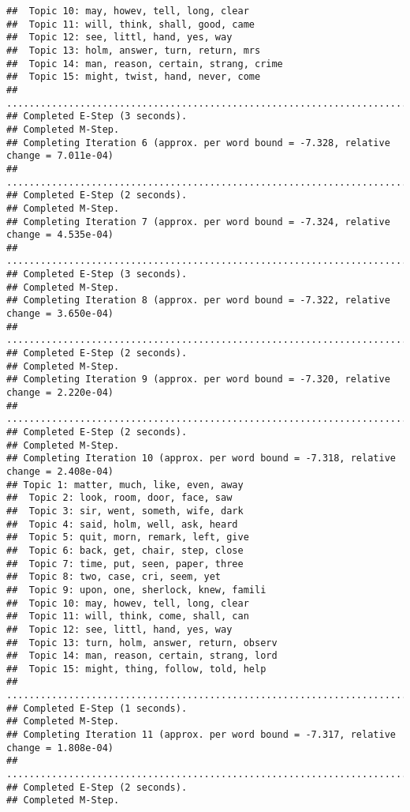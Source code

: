 \documentclass[
]{book}
\begin{document}
\begin{verbatim}
##  Topic 10: may, howev, tell, long, clear 
##  Topic 11: will, think, shall, good, came 
##  Topic 12: see, littl, hand, yes, way 
##  Topic 13: holm, answer, turn, return, mrs 
##  Topic 14: man, reason, certain, strang, crime 
##  Topic 15: might, twist, hand, never, come 
## ....................................................................................................
## Completed E-Step (3 seconds). 
## Completed M-Step. 
## Completing Iteration 6 (approx. per word bound = -7.328, relative change = 7.011e-04) 
## ....................................................................................................
## Completed E-Step (2 seconds). 
## Completed M-Step. 
## Completing Iteration 7 (approx. per word bound = -7.324, relative change = 4.535e-04) 
## ....................................................................................................
## Completed E-Step (3 seconds). 
## Completed M-Step. 
## Completing Iteration 8 (approx. per word bound = -7.322, relative change = 3.650e-04) 
## ....................................................................................................
## Completed E-Step (2 seconds). 
## Completed M-Step. 
## Completing Iteration 9 (approx. per word bound = -7.320, relative change = 2.220e-04) 
## ....................................................................................................
## Completed E-Step (2 seconds). 
## Completed M-Step. 
## Completing Iteration 10 (approx. per word bound = -7.318, relative change = 2.408e-04) 
## Topic 1: matter, much, like, even, away 
##  Topic 2: look, room, door, face, saw 
##  Topic 3: sir, went, someth, wife, dark 
##  Topic 4: said, holm, well, ask, heard 
##  Topic 5: quit, morn, remark, left, give 
##  Topic 6: back, get, chair, step, close 
##  Topic 7: time, put, seen, paper, three 
##  Topic 8: two, case, cri, seem, yet 
##  Topic 9: upon, one, sherlock, knew, famili 
##  Topic 10: may, howev, tell, long, clear 
##  Topic 11: will, think, come, shall, can 
##  Topic 12: see, littl, hand, yes, way 
##  Topic 13: turn, holm, answer, return, observ 
##  Topic 14: man, reason, certain, strang, lord 
##  Topic 15: might, thing, follow, told, help 
## ....................................................................................................
## Completed E-Step (1 seconds). 
## Completed M-Step. 
## Completing Iteration 11 (approx. per word bound = -7.317, relative change = 1.808e-04) 
## ....................................................................................................
## Completed E-Step (2 seconds). 
## Completed M-Step. 

\end{verbatim}
\end{document}

